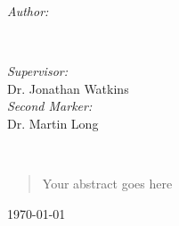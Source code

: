 \begin{titlepage}
\begin{minipage}{0.4\textwidth}
\begin{flushleft} \large
\emph{Author:}\\
\@author %
\end{flushleft}
\end{minipage}
~
\begin{minipage}{0.4\textwidth}
\begin{flushright} \large
\emph{Supervisor:} \\
Dr. Jonathan Watkins \\[1.2em] %
\emph{Second Marker:} \\
Dr. Martin Long %
\end{flushright}
\end{minipage}\\[1cm]
\makeatother


\begin{abstract}
Your abstract goes here
\end{abstract}
\vspace{1cm}


{\large \today}\\[2cm] %

\vfill %

\end{titlepage}